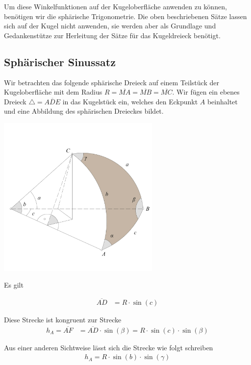 \begin{refsection}
Um diese Winkelfunktionen auf der Kugeloberfläche anwenden zu können, benötigen wir die sphärische Trigonometrie. Die oben beschriebenen Sätze lassen sich auf der Kugel nicht anwenden, sie werden aber als Grundlage und Gedankenstütze zur Herleitung der Sätze für das Kugeldreieck benötigt.



\subsection{Sphärischer Sinussatz}
Wir betrachten das folgende sphärische Dreieck auf einem Teilstück der Kugeloberfläche mit dem Radius $R= \overline{MA} = \overline{MB} = \overline{MC}$. Wir fügen ein ebenes Dreieck $\triangle=\overline{ADE}$ in das Kugelstück ein, welches den Eckpunkt $A$ beinhaltet und eine Abbildung des sphärischen Dreieckes bildet.

\begin{center}
        \includegraphics[width=0.6\textwidth]{kugel/Sinussatz.jpg}
\end{center}

Es gilt

\begin{align*}
\overline{AD} &= R \cdot \sin (c)
\end{align*}

Diese Strecke ist kongruent zur Strecke
\begin{align}
h_{A} = \overline{AF} &= \overline{AD} \cdot \sin(\beta) = R \cdot \sin(c) \cdot \sin(\beta)  
\label {V1}
\end{align}

Aus einer anderen Sichtweise lässt sich die Strecke wie folgt schreiben
\begin{align}
h_{A} = R \cdot \sin(b) \cdot \sin(\gamma)  
\label {V2}
\end{align}


\end{refsection}
